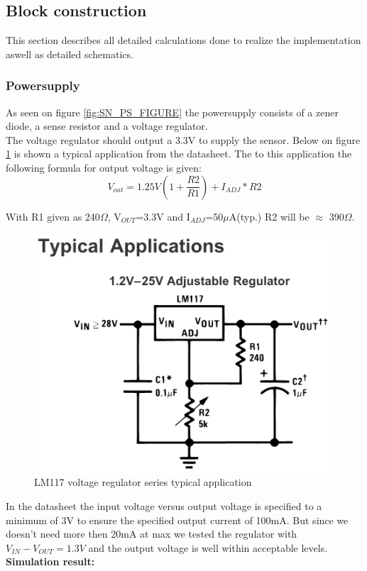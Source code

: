 \subsection{Block construction}
This section describes all detailed calculations done to realize the implementation aswell as detailed schematics.\\

\subsubsection{Powersupply}
As seen on figure \ref{fig:SN_PS_FIGURE} the powersupply consists of a zener diode, a sense resistor and a voltage regulator.\\
The voltage regulator should output a 3.3V to supply the sensor. Below on figure \ref{fig:LM317} is shown a typical application from the datasheet. The to this application the following formula for output voltage is given:\\
\begin{equation}
	V_{out}=1.25V\left(1+\frac{R2}{R1}\right)+ I_{ADJ}*R2
\end{equation}

With R1 given as 240$\Omega$, V$_{OUT}$=3.3V and I$_{ADJ}$=50$\mu$A(typ.) R2 will be $\approx$ 390$\Omega$.


\begin{figure}[H]
	\centering
	\includegraphics[width=.5\textwidth]{billeder/LM317}
	\caption{LM117 voltage regulator series typical application}
	\label{fig:LM317}
\end{figure}

In the datasheet the input voltage versus output voltage is specified to a minimum of 3V to ensure the specified output current of 100mA. But since we doesn't need more then 20mA at max we tested the regulator with $V_{IN}-V_{OUT}=1.3V$ and the output voltage is well within acceptable levels.\\

\textbf{Simulation result:}\\

